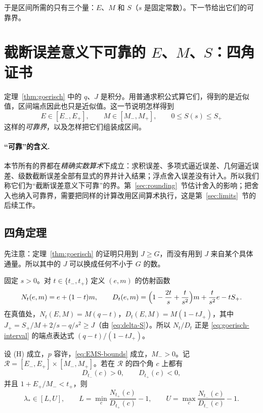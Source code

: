 \documentclass[11pt,a4paper,fontset=fandol]{ctexart}
\begin{document}
于是区间所需的只有三个量：$E$、$M$ 和 $S$（$s$ 是固定常数）。下一节给出它们的可靠界。

\section{截断误差意义下可靠的 $E$、$M$、$S$：四角证书}
\label{sec:fourcorner}
定理~\ref{thm:goerisch} 中的 $q$、$J$ 是积分。用普通求积公式算它们，得到的是近似值，区间端点因此也只是近似值。这一节说明怎样得到
\begin{equation}
\label{eq:EMS-bounds}
E\in[E_-,E_+],\qquad M\in[M_-,M_+],\qquad 0\le S(s)\le S_+
\end{equation}
这样的\emph{可靠界}，以及怎样把它们组装成区间。

\paragraph{“可靠”的含义.} 本节所有的界都在\emph{精确实数算术}下成立：求积误差、多项式逼近误差、几何逼近误差、级数截断误差全部有显式的界并计入结果；浮点舍入误差没有计入。所以我们称它们为“截断误差意义下可靠”的界。第~\ref{sec:rounding}~节估计舍入的影响；把舍入也纳入可靠界，需要把同样的计算改用区间算术执行，这是第~\ref{sec:limits}~节的后续工作。

\subsection{四角定理}

先注意：定理~\ref{thm:goerisch} 的证明只用到 $J\ge G$，而没有用到 $J$ 来自某个具体通量。所以其中的 $J$ 可以换成任何不小于 $G$ 的数。

固定 $s>0$。对 $t\in\{t_-,t_+\}$ 定义 $(e,m)$ 的仿射函数
\begin{equation}
\label{eq:ND}
N_t(e,m)=e+(1-t)m,\qquad
D_t(e,m)=\Bigl(1-\frac{2t}{s}+\frac{t}{s^2}\Bigr)m+\frac{t}{s^2}e-tS_+ .
\end{equation}
在真值处，$N_t(E,M)=M(q-t)$，$D_t(E,M)=M(1-tJ_+)$，其中 $J_+=S_+/M+2/s-q/s^2\ge J$（由 \eqref{eq:delta-S}）。所以 $N_t/D_t$ 正是 \eqref{eq:goerisch-interval} 的端点表达式 $(q-t)/(1-tJ_+)$。

\begin{theorem}[四角区间]
\label{thm:four-corner}
设 (H) 成立，$p$ 容许，\eqref{eq:EMS-bounds} 成立，$M_->0$。记 $\mathcal R=[E_-,E_+]\times[M_-,M_+]$。若在 $\mathcal R$ 的四个角 $c$ 上都有
\begin{equation}
\label{eq:corner-signs}
D_{t_-}(c)>0,\qquad D_{t_+}(c)<0,
\end{equation}
并且 $1+E_+/M_-<t_+$，则
\begin{equation}
\label{eq:four-corner}
\lambda_*\in[L,U],\qquad
L=\min_{c}\frac{N_{t_+}(c)}{D_{t_+}(c)}-1,\qquad
U=\max_{c}\frac{N_{t_-}(c)}{D_{t_-}(c)}-1 .
\end{equation}
\end{theorem}
\end{document}
